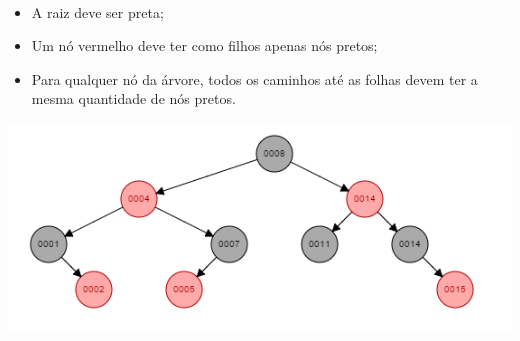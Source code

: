 \documentclass[answers]{exam}
\begin{document}
\begin{questions}
    \
    \begin{solution}
        \begin{itemize}
            \item A raiz deve ser preta;
            \item Um nó vermelho deve ter como filhos apenas nós pretos;
            \item Para qualquer nó da árvore, todos os caminhos até as folhas
                devem ter a mesma quantidade de nós pretos.
        \end{itemize}
        \begin{center}
            \includegraphics[width=.8\textwidth]{img/rbtree}
        \end{center}
    \end{solution}
  \end{questions}
\end{document}
